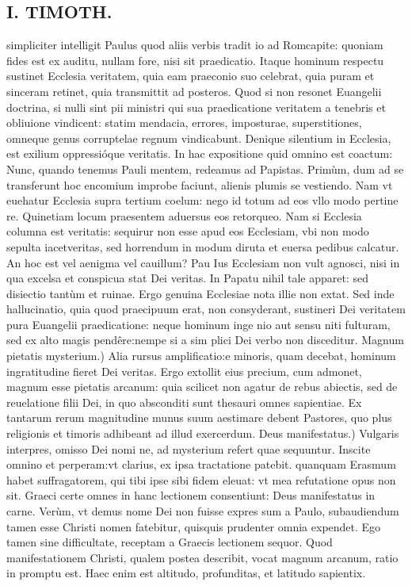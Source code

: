 \documentclass{article}
\begin{document}
\begin{pages}
\section*{I. TIMOTH. }
\marginpar{[ p.40 ]}\pstart simpliciter intelligit Paulus quod aliis verbis tradit io ad Romcapite: quoniam fides est ex auditu, nullam fore, nisi sit praedicatio. Itaque hominum respectu sustinet Ecclesia veritatem, quia eam praeconio suo celebrat, quia puram et sinceram retinet, quia transmittit ad posteros. Quod si non resonet Euangelii doctrina, si nulli sint pii ministri qui sua praedicatione veritatem a tenebris et obliuione vindicent: statim mendacia, errores, imposturae, superstitiones, omneque genus corruptelae regnum vindicabunt. Denique silentium in Ecclesia, est exilium oppressióque veritatis. In hac expositione quid omnino est coactum: Nunc, quando tenemus Pauli mentem, redeamus ad Papistas. Primùm, dum ad se transferunt hoc encomium improbe faciunt, alienis plumis se vestiendo. Nam vt euehatur Ecclesia supra tertium coelum: nego id totum ad eos vllo modo pertine re. Quinetiam locum praesentem aduersus eos retorqueo. Nam si Ecclesia columna est veritatis: sequirur non esse apud eos Ecclesiam, vbi non modo sepulta iacetveritas, sed horrendum in modum diruta et euersa pedibus calcatur. An hoc est vel aenigma vel cauillum? Pau Ius Ecclesiam non vult agnosci, nisi in qua excelsa et conspicua stat Dei veritas. In Papatu nihil tale apparet: sed disiectio tantùm et ruinae. Ergo genuina Ecclesiae nota illie non extat. Sed inde hallucinatio, quia quod praecipuum erat, non consyderant, sustineri Dei veritatem pura Euangelii praedicatione: neque hominum inge nio aut sensu niti fulturam, sed ex alto magis pendêre:nempe si a sim plici Dei verbo non disceditur.  \pend\pstart Magnum pietatis mysterium.) Alia rursus amplificatio:e minoris, quam decebat, hominum ingratitudine fieret Dei veritas. Ergo extollit eius precium, cum admonet, magnum esse pietatis arcanum: quia scilicet non agatur de rebus abiectis, sed de reuelatione filii Dei, in quo absconditi sunt thesauri omnes sapientiae. Ex tantarum rerum magnitudine munus suum aestimare debent Pastores, quo plus religionis et timoris adhibeant ad illud exercerdum.  \pend\pstart Deus manifestatus.) Vulgaris interpres, omisso Dei nomi ne, ad mysterium refert quae sequuntur. Inscite omnino et perperam:vt clarius, ex ipsa tractatione patebit. quanquam Erasmum habet suffragatorem, qui tibi ipse sibi fidem eleuat: vt mea refutatione opus non sit. Graeci certe omnes in hanc lectionem consentiunt: Deus manifestatus in carne. Verùm, vt demus nome Dei non fuisse expres sum a Paulo, subaudiendum tamen esse Christi nomen fatebitur, quisquis prudenter omnia expendet. Ego tamen sine difficultate, receptam a Graecis lectionem sequor. Quod manifestationem Christi, qualem postea describit, vocat magnum arcanum, ratio in promptu est. Haec enim est altitudo, profunditas, et latitudo sapientix.  \pend

\end{pages}
\end{document}
